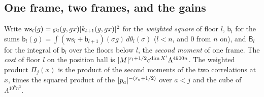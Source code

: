 \subsection{One frame, two frames, and the gains}\label{ss:frames-gains}
Write $\mathrm{ws}_l(g)=\wp_l(g,gx)\lvert k_{l+1}(g,gx)\rvert^2$ for the \emph{weighted square} of floor $l$, $\mathsf b_l$ for the sums $\mathsf b_l(g)=\int(\mathrm{ws}_l+\mathsf b_{l+1})(\sigma g)\,d\theta_l(\sigma)$ ($l<n$, and $0$ from $n$ on), and
$\mathsf B_l$ for the integral of $\mathsf b_l$ over the floors below $l$, the \emph{second moment} of one frame. The \emph{cost} of floor $l$ on the position ball is $\lvert M\rvert^{r_l+1/2}c^{\dim X'}\Lambda^{4900n}$. The weighted product
$\Pi_j(x)$ is the product of the second moments of the two correlations at $x$, times the squared product of the $\lvert p_a\rvert^{-(r_a+1/2)}$ over $a<j$ and the cube of $\Lambda^{10^6n^3}$.

